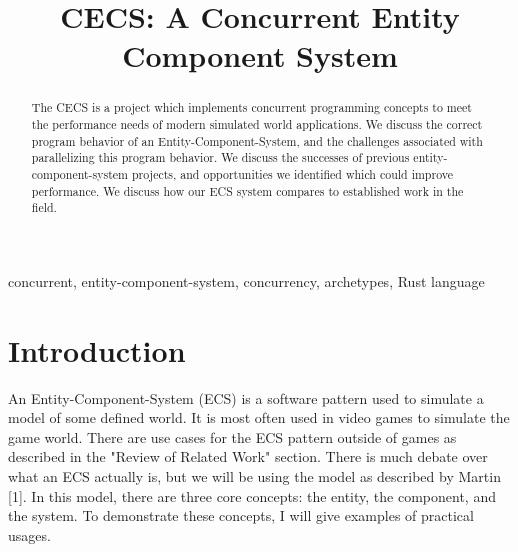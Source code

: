 \documentclass[conference]{IEEEtran}
\begin{document}
\title{CECS: A Concurrent Entity Component System}

\author{
\and
{}
}

\maketitle

\begin{abstract}
The CECS is a project which implements concurrent programming concepts
to meet the performance needs of modern simulated world applications. We discuss 
the correct program behavior of an Entity-Component-System, and the challenges
associated with parallelizing this program behavior. We discuss the successes 
of previous entity-component-system projects, and opportunities we identified which could improve performance. We discuss how our ECS system compares to established work in the field. 
\end{abstract}

\begin{IEEEkeywords}
concurrent, entity-component-system, concurrency, archetypes, Rust language
\end{IEEEkeywords}

\section{Introduction}
An Entity-Component-System (ECS) is a software pattern used to simulate a model of some defined world. It is most often used in video games to simulate the game world. There are use cases for the ECS pattern outside of games as described in the "Review of Related Work" section. There is much debate over what an ECS actually is, but we will be using the model as described by Martin [1]. In this model, there are three core concepts: the entity, the component, and the system. To demonstrate these concepts, I will give examples of practical usages.
\end{document}

